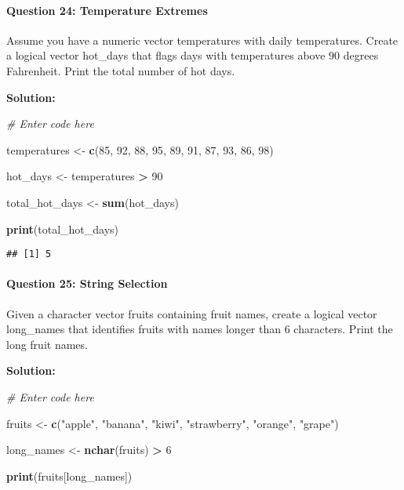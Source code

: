 \documentclass[
]{article}
\newenvironment{Shaded}{\begin{snugshade}}{\end{snugshade}}
\newcommand{\CommentTok}[1]{\textcolor[rgb]{0.56,0.35,0.01}{\textit{#1}}}
\newcommand{\DecValTok}[1]{\textcolor[rgb]{0.00,0.00,0.81}{#1}}
\newcommand{\FunctionTok}[1]{\textcolor[rgb]{0.13,0.29,0.53}{\textbf{#1}}}
\newcommand{\NormalTok}[1]{#1}
\newcommand{\OtherTok}[1]{\textcolor[rgb]{0.56,0.35,0.01}{#1}}
\newcommand{\SpecialCharTok}[1]{\textcolor[rgb]{0.81,0.36,0.00}{\textbf{#1}}}
\newcommand{\StringTok}[1]{\textcolor[rgb]{0.31,0.60,0.02}{#1}}
\begin{document}
\hypertarget{question-24-temperature-extremes}{%
\paragraph{Question 24: Temperature
Extremes}\label{question-24-temperature-extremes}}

Assume you have a numeric vector temperatures with daily temperatures.
Create a logical vector hot\_days that flags days with temperatures
above 90 degrees Fahrenheit. Print the total number of hot days.

\textbf{Solution:}

\begin{Shaded}
\begin{Highlighting}[]
\CommentTok{\# Enter code here}

\NormalTok{temperatures }\OtherTok{\textless{}{-}} \FunctionTok{c}\NormalTok{(}\DecValTok{85}\NormalTok{, }\DecValTok{92}\NormalTok{, }\DecValTok{88}\NormalTok{, }\DecValTok{95}\NormalTok{, }\DecValTok{89}\NormalTok{, }\DecValTok{91}\NormalTok{, }\DecValTok{87}\NormalTok{, }\DecValTok{93}\NormalTok{, }\DecValTok{86}\NormalTok{, }\DecValTok{98}\NormalTok{)}

\NormalTok{hot\_days }\OtherTok{\textless{}{-}}\NormalTok{ temperatures }\SpecialCharTok{\textgreater{}} \DecValTok{90}

\NormalTok{total\_hot\_days }\OtherTok{\textless{}{-}} \FunctionTok{sum}\NormalTok{(hot\_days)}

\FunctionTok{print}\NormalTok{(total\_hot\_days)}
\end{Highlighting}
\end{Shaded}

\begin{verbatim}
## [1] 5
\end{verbatim}

\hypertarget{question-25-string-selection}{%
\paragraph{Question 25: String
Selection}\label{question-25-string-selection}}

Given a character vector fruits containing fruit names, create a logical
vector long\_names that identifies fruits with names longer than 6
characters. Print the long fruit names.

\textbf{Solution:}

\begin{Shaded}
\begin{Highlighting}[]
\CommentTok{\# Enter code here}

\NormalTok{fruits }\OtherTok{\textless{}{-}} \FunctionTok{c}\NormalTok{(}\StringTok{"apple"}\NormalTok{, }\StringTok{"banana"}\NormalTok{, }\StringTok{"kiwi"}\NormalTok{, }\StringTok{"strawberry"}\NormalTok{, }\StringTok{"orange"}\NormalTok{, }\StringTok{"grape"}\NormalTok{)}

\NormalTok{long\_names }\OtherTok{\textless{}{-}} \FunctionTok{nchar}\NormalTok{(fruits) }\SpecialCharTok{\textgreater{}} \DecValTok{6}

\FunctionTok{print}\NormalTok{(fruits[long\_names])}
\end{Highlighting}
\end{Shaded}
\end{document}
